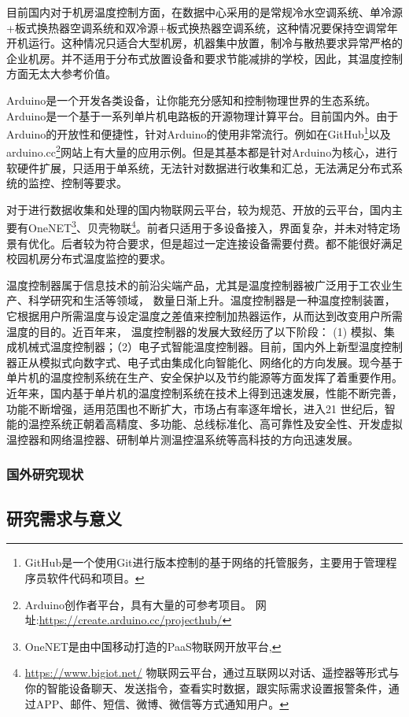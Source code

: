 目前国内对于机房温度控制方面，在数据中心采用的是常规冷水空调系统、单冷源+板式换热器空调系统和双冷源+板式换热器空调系统，这种情况要保持空调常年开机运行。这种情况只适合大型机房，机器集中放置，制冷与散热要求异常严格的企业机房。并不适用于分布式放置设备和要求节能减排的学校，因此，其温度控制方面无太大参考价值。




Arduino是一个开发各类设备，让你能充分感知和控制物理世界的生态系统。Arduino是一个基于一系列单片机电路板的开源物理计算平台。目前国内外。由于Arduino的开放性和便捷性，针对Arduino的使用非常流行。例如在GitHub\footnote{GitHub是一个使用Git进行版本控制的基于网络的托管服务，主要用于管理程序员软件代码和项目。}以及arduino.cc\footnote{Arduino创作者平台，具有大量的可参考项目。 网址:\url{https://create.arduino.cc/projecthub/} }网站上有大量的应用示例。但是其基本都是针对Arduino为核心，进行软硬件扩展，只适用于单系统，无法针对数据进行收集和汇总，无法满足分布式系统的监控、控制等要求。

对于进行数据收集和处理的国内物联网云平台，较为规范、开放的云平台，国内主要有OneNET\footnote{OneNET是由中国移动打造的PaaS物联网开放平台,}、贝壳物联\footnote{\url{https://www.bigiot.net/} 物联网云平台，通过互联网以对话、遥控器等形式与你的智能设备聊天、发送指令，查看实时数据，跟实际需求设置报警条件，通过APP、邮件、短信、微博、微信等方式通知用户。}。前者只适用于多设备接入，界面复杂，并未对特定场景有优化。后者较为符合要求，但是超过一定连接设备需要付费。都不能很好满足校园机房分布式温度监控的要求。

温度控制器属于信息技术的前沿尖端产品，尤其是温度控制器被广泛用于工农业生产、科学研究和生活等领域， 数量日渐上升。温度控制器是一种温度控制装置，它根据用户所需温度与设定温度之差值来控制加热器运作，从而达到改变用户所需温度的目的。近百年来， 温度控制器的发展大致经历了以下阶段：
(1) 模拟、集成机械式温度控制器；（2）电子式智能温度控制器。目前，国内外上新型温度控制器正从模拟式向数字式、电子式由集成化向智能化、网络化的方向发展。现今基于单片机的温度控制系统在生产、安全保护以及节约能源等方面发挥了着重要作用。近年来，国内基于单片机的温度控制系统在技术上得到迅速发展，性能不断完善，功能不断增强，适用范围也不断扩大，市场占有率逐年增长，进入21 世纪后，智能的温控系统正朝着高精度、多功能、总线标准化、高可靠性及安全性、开发虚拟温控器和网络温控器、研制单片测温控温系统等高科技的方向迅速发展。

\subsubsection{国外研究现状}


\subsection{研究需求与意义}

